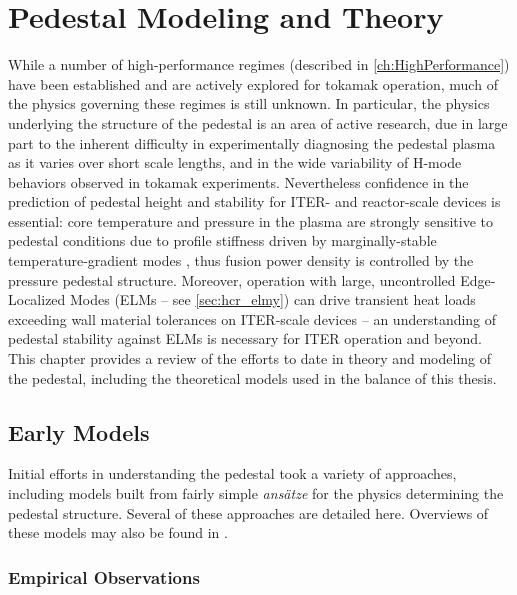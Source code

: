 \chapter{Pedestal Modeling and Theory}\label{ch:Modeling}

While a number of high-performance regimes (described in \cref{ch:HighPerformance}) have been established and are actively explored for tokamak operation, much of the physics governing these regimes is still unknown.  In particular, the physics underlying the structure of the pedestal is an area of active research, due in large part to the inherent difficulty in experimentally diagnosing the pedestal plasma as it varies over short scale lengths, and in the wide variability of H-mode behaviors observed in tokamak experiments.  Nevertheless confidence in the prediction of pedestal height and stability for ITER- and reactor-scale devices is essential: core temperature and pressure in the plasma are strongly sensitive to pedestal conditions due to profile stiffness driven by marginally-stable temperature-gradient modes \cite{Hubbard1998}, thus fusion power density is controlled by the pressure pedestal structure.  Moreover, operation with large, uncontrolled Edge-Localized Modes (ELMs -- see \cref{sec:hcr_elmy}) can drive transient heat loads exceeding wall material tolerances on ITER-scale devices \cite{Loarte2003,Federici2003} -- an understanding of pedestal stability against ELMs is necessary for ITER operation and beyond.  This chapter provides a review of the efforts to date in theory and modeling of the pedestal, including the theoretical models used in the balance of this thesis.\nicesectionending{}

\section{Early Models}\label{sec:mod_early}

Initial efforts in understanding the pedestal took a variety of approaches, including models built from fairly simple \emph{ans\"{a}tze} for the physics determining the pedestal structure.  Several of these approaches are detailed here.  Overviews of these models may also be found in \cite[\S 2]{Hubbard2000,Hughes2005}.

\subsection{Empirical Observations}\label{subsec:mod_empirical}

